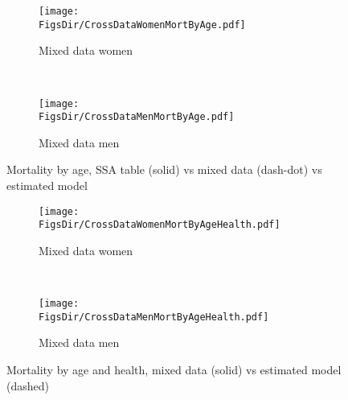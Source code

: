 \documentclass[12pt,pdftex,letterpaper]{article}
\newcommand{\RootDir}{..}
\newcommand{\FigsDir}{\RootDir/Figures}
\begin{document}
\begin{figure}[H]
	\centering
	\begin{subfigure}[b]{0.48\textwidth}
		\texttt{[image: \\FigsDir/CrossDataWomenMortByAge.pdf]}
		\caption{Mixed data women}\label{fig:MixedWomenMortFit}
	\end{subfigure}
	~
	\centering
	\begin{subfigure}[b]{0.48\textwidth}
		\texttt{[image: \\FigsDir/CrossDataMenMortByAge.pdf]}
		\caption{Mixed data men}\label{fig:MixedMenMortFit}
	\end{subfigure}
	\caption{Mortality by age, SSA table (solid) vs mixed data (dash-dot) vs estimated model} \label{fig:MortFitMixed}
\end{figure}


\begin{figure}[H]
	\centering
	\begin{subfigure}[b]{0.48\textwidth}
		\texttt{[image: \\FigsDir/CrossDataWomenMortByAgeHealth.pdf]}
		\caption{Mixed data women}\label{fig:MixedWomenMortHealthFit}
	\end{subfigure}
	~
	\centering
	\begin{subfigure}[b]{0.48\textwidth}
		\texttt{[image: \\FigsDir/CrossDataMenMortByAgeHealth.pdf]}
		\caption{Mixed data men}\label{fig:MixedMenMortHealthFit}
	\end{subfigure}
	\caption{Mortality by age and health, mixed data (solid) vs estimated model (dashed)} \label{fig:MortFitByHealthMixed}
\end{figure}

\newpage
\end{document}

